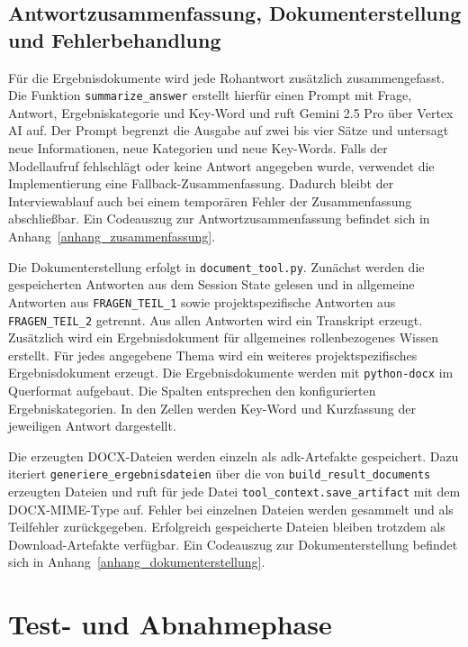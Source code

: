 \documentclass[
  10pt,
  ngerman,
  a4paper,
  toc=graduated,
  numbers=noenddot,
  headings=standardclasses,
  nonumberlist
]{scrartcl}
\newcommand{\code}[1]{\nolinkurl{#1}}
\begin{document}
\subsection{Antwortzusammenfassung, Dokumenterstellung und Fehlerbehandlung}
\label{antwortzusammenfassung_dokumenterstellung_fehlerbehandlung}

Für die Ergebnisdokumente wird jede Rohantwort zusätzlich zusammengefasst. Die Funktion \code{summarize\_answer} erstellt hierfür einen Prompt mit Frage, Antwort, Ergebniskategorie und Key-Word und ruft Gemini 2.5 Pro über Vertex AI auf. Der Prompt begrenzt die Ausgabe auf zwei bis vier Sätze und untersagt neue Informationen, neue Kategorien und neue Key-Words. Falls der Modellaufruf fehlschlägt oder keine Antwort angegeben wurde, verwendet die Implementierung eine Fallback-Zusammenfassung. Dadurch bleibt der Interviewablauf auch bei einem temporären Fehler der Zusammenfassung abschließbar. Ein Codeauszug zur Antwortzusammenfassung befindet sich in Anhang~\ref{anhang_zusammenfassung}.

Die Dokumenterstellung erfolgt in \code{document\_tool.py}. Zunächst werden die gespeicherten Antworten aus dem Session State gelesen und in allgemeine Antworten aus \code{FRAGEN\_TEIL\_1} sowie projektspezifische Antworten aus \code{FRAGEN\_TEIL\_2} getrennt. Aus allen Antworten wird ein Transkript erzeugt. Zusätzlich wird ein Ergebnisdokument für allgemeines rollenbezogenes Wissen erstellt. Für jedes angegebene Thema wird ein weiteres projektspezifisches Ergebnisdokument erzeugt. Die Ergebnisdokumente werden mit \code{python-docx} im Querformat aufgebaut. Die Spalten entsprechen den konfigurierten Ergebniskategorien. In den Zellen werden Key-Word und Kurzfassung der jeweiligen Antwort dargestellt.

Die erzeugten DOCX-Dateien werden einzeln als \gls{adk}-Artefakte gespeichert. Dazu iteriert \code{generiere\_ergebnisdateien} über die von \code{build\_result\_documents} erzeugten Dateien und ruft für jede Datei \code{tool\_context.save\_artifact} mit dem DOCX-MIME-Type auf. Fehler bei einzelnen Dateien werden gesammelt und als Teilfehler zurückgegeben. Erfolgreich gespeicherte Dateien bleiben trotzdem als Download-Artefakte verfügbar. Ein Codeauszug zur Dokumenterstellung befindet sich in Anhang~\ref{anhang_dokumenterstellung}.

\section{Test- und Abnahmephase}
\label{test_und_abnahmephase}
\end{document}
